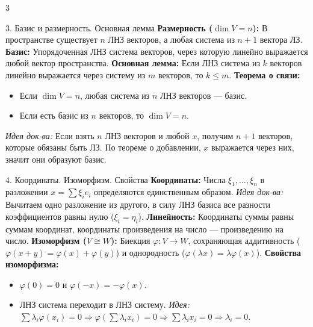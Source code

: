 \documentclass[8pt, a4paper, landscape]{extarticle}
\newcommand{\Ra}{\Rightarrow}
\begin{document}
\begin{multicols*}{3}
\begin{ticket}{3. Базис и размерность. Основная лемма}
\textbf{Размерность ($\dim V = n$):} В пространстве существует $n$ ЛНЗ векторов, а любая система из $n+1$ вектора ЛЗ.
\textbf{Базис:} Упорядоченная ЛНЗ система векторов, через которую линейно выражается любой вектор пространства.
\textbf{Основная лемма:} Если ЛНЗ система из $k$ векторов линейно выражается через систему из $m$ векторов, то $k \le m$.
\tcblower
\textbf{Теорема о связи:}
\begin{itemize}
    \item Если $\dim V = n$, любая система из $n$ ЛНЗ векторов --- базис.
    \item Если есть базис из $n$ векторов, то $\dim V = n$.
\end{itemize}
\textit{Идея док-ва:} Если взять $n$ ЛНЗ векторов и любой $x$, получим $n+1$ векторов, которые обязаны быть ЛЗ. По теореме о добавлении, $x$ выражается через них, значит они образуют базис.
\end{ticket}

\begin{ticket}{4. Координаты. Изоморфизм. Свойства}
\textbf{Координаты:} Числа $\xi_1, \dots, \xi_n$ в разложении $x = \sum \xi_i e_i$ определяются единственным образом.
\textit{Идея док-ва:} Вычитаем одно разложение из другого, в силу ЛНЗ базиса все разности коэффициентов равны нулю ($\xi_i = \eta_i$).
\textbf{Линейность:} Координаты суммы равны суммам координат, координаты произведения на число --- произведению на число.
\tcblower
\textbf{Изоморфизм ($V \cong W$):} Биекция $\varphi: V \to W$, сохраняющая аддитивность ($\varphi(x+y)=\varphi(x)+\varphi(y)$) и однородность ($\varphi(\lambda x)=\lambda\varphi(x)$).
\textbf{Свойства изоморфизма:}
\begin{itemize}
    \item $\varphi(0) = 0$ и $\varphi(-x) = -\varphi(x)$.
    \item ЛНЗ система переходит в ЛНЗ систему. \textit{Идея:} $\sum \lambda_i \varphi(x_i) = 0 \Ra \varphi(\sum \lambda_i x_i) = 0 \Ra \sum \lambda_i x_i = 0 \Ra \lambda_i = 0$.
\end{itemize}
\end{ticket}


\end{multicols*}
\end{document}

